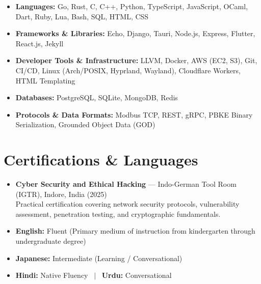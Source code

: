 \documentclass[10pt,a4paper]{article}
\begin{document}
\begin{itemize}
  \item \textbf{Languages:} Go, Rust, C, C++, Python, TypeScript, JavaScript, OCaml, Dart, Ruby, Lua, Bash, SQL, HTML, CSS
  \item \textbf{Frameworks \& Libraries:} Echo, Django, Tauri, Node.js, Express, Flutter, React.js, Jekyll
  \item \textbf{Developer Tools \& Infrastructure:} LLVM, Docker, AWS (EC2, S3), Git, CI/CD, Linux (Arch/POSIX, Hyprland, Wayland), Cloudflare Workers, HTML Templating
  \item \textbf{Databases:} PostgreSQL, SQLite, MongoDB, Redis
  \item \textbf{Protocols \& Data Formats:} Modbus TCP, REST, gRPC, PBKE Binary Serialization, Grounded Object Data (GOD)
\end{itemize}

\section*{Certifications \& Languages}

\begin{itemize}
  \item \textbf{Cyber Security and Ethical Hacking} --- Indo-German Tool Room (IGTR), Indore, India (2025) \\
  \small Practical certification covering network security protocols, vulnerability assessment, penetration testing, and cryptographic fundamentals.
  \item \textbf{English:} Fluent (Primary medium of instruction from kindergarten through undergraduate degree)
  \item \textbf{Japanese:} Intermediate (Learning / Conversational)
  \item \textbf{Hindi:} Native Fluency \ $\vert$ \ \textbf{Urdu:} Conversational
\end{itemize}
\end{document}
